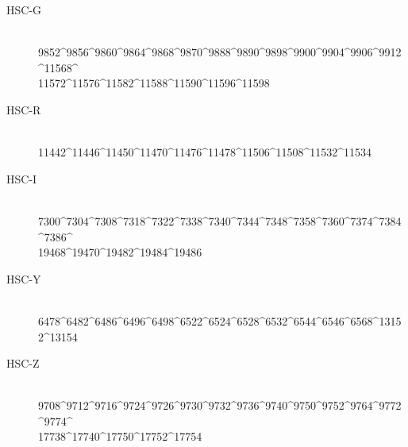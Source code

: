 \documentclass[DM,lsstdraft,STS,toc]{lsstdoc}
\begin{document}
\begin{description}

\item[HSC-G]{\hfill \\ 9852\^{}9856\^{}9860\^{}9864\^{}9868\^{}9870\^{}9888\^{}9890\^{}9898\^{}9900\^{}9904\^{}9906\^{}9912\^{}11568\^{}\\11572\^{}11576\^{}11582\^{}11588\^{}11590\^{}11596\^{}11598}
\item[HSC-R]{\hfill \\ 11442\^{}11446\^{}11450\^{}11470\^{}11476\^{}11478\^{}11506\^{}11508\^{}11532\^{}11534}
\item[HSC-I]{\hfill \\ 7300\^{}7304\^{}7308\^{}7318\^{}7322\^{}7338\^{}7340\^{}7344\^{}7348\^{}7358\^{}7360\^{}7374\^{}7384\^{}7386\^{}\\19468\^{}19470\^{}19482\^{}19484\^{}19486}
\item[HSC-Y]{\hfill \\ 6478\^{}6482\^{}6486\^{}6496\^{}6498\^{}6522\^{}6524\^{}6528\^{}6532\^{}6544\^{}6546\^{}6568\^{}13152\^{}13154}
\item[HSC-Z]{\hfill \\ 9708\^{}9712\^{}9716\^{}9724\^{}9726\^{}9730\^{}9732\^{}9736\^{}9740\^{}9750\^{}9752\^{}9764\^{}9772\^{}9774\^{}\\17738\^{}17740\^{}17750\^{}17752\^{}17754}

\end{description}
\end{document}
